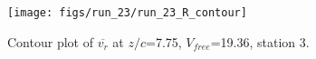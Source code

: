 \begin{figure}[H]
\centering
\texttt{[image: figs/run\_23/run\_23\_R\_contour]}
\caption{Contour plot of $\overline{v_{r}}$ at $z/c$=7.75, $V_{free}$=19.36, station 3.}
\label{fig:run_23_R_contour}
\end{figure}


